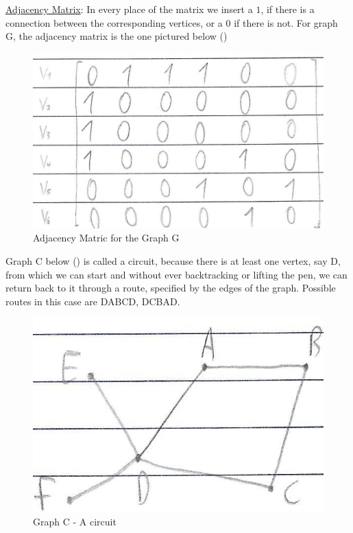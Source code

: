 \documentclass[12pt]{article}
\begin{document}
\begin{flushleft}
	\textbullet \quad \uline{Adjacency Matrix}: In every place of the matrix we insert a $1$, if there is a connection between the corresponding vertices, or a $0$ if there is not. For graph G, the adjacency matrix is the one pictured below () \linebreak 
	
	\begin{figure}[ht]
	\centering
	\includegraphics[scale=1]{adjacencyMatricGraphG}
	\caption{Adjacency Matric for the Graph G}
	\label{fig:adjacencyMatricGraphG}
	\end{figure}
	
	\textbullet \quad Graph C below () is called a circuit, because there is at least one vertex, say D, from which we can start and without ever backtracking or lifting the pen, we can return back to it through a route, specified by the edges of the graph. Possible routes in this case are DABCD, DCBAD. \linebreak 
   
   	\begin{figure}[ht]
	\centering
	\includegraphics[scale=1]{graphC}
	\caption{Graph C - A circuit}
	\label{fig:graphC}
	\end{figure}
	

\end{flushleft}
\end{document}
